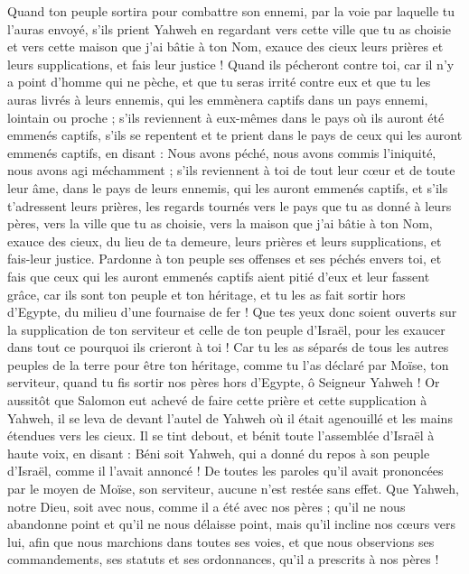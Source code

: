 \begin{multicols}{2}
Quand ton peuple sortira pour combattre son ennemi, par la voie par laquelle tu l'auras envoyé, s'ils prient Yahweh en regardant vers cette ville que tu as choisie et vers cette maison que j'ai bâtie à ton Nom, 
exauce des cieux leurs prières et leurs supplications, et fais leur justice !
Quand ils pécheront contre toi, car il n'y a point d'homme qui ne pèche, et que tu seras irrité contre eux et que tu les auras livrés à leurs ennemis, qui les emmènera captifs dans un pays ennemi, lointain ou proche ;
s'ils reviennent à eux-mêmes dans le pays où ils auront été emmenés captifs, s'ils se repentent et te prient dans le pays de ceux qui les auront emmenés captifs, en disant : Nous avons péché, nous avons commis l'iniquité, nous avons agi méchamment ;
s'ils reviennent à toi de tout leur cœur et de toute leur âme, dans le pays de leurs ennemis, qui les auront emmenés captifs, et s'ils t'adressent leurs prières, les regards tournés vers le pays que tu as donné à leurs pères, vers la ville que tu as choisie, vers la maison que j'ai bâtie à ton Nom,
exauce des cieux, du lieu de ta demeure, leurs prières et leurs supplications, et fais-leur justice.
Pardonne à ton peuple ses offenses et ses péchés envers toi, et fais que ceux qui les auront emmenés captifs aient pitié d'eux et leur fassent grâce,
car ils sont ton peuple et ton héritage, et tu les as fait sortir hors d'Egypte, du milieu d'une fournaise de fer !
Que tes yeux donc soient ouverts sur la supplication de ton serviteur et celle de ton peuple d'Israël, pour les exaucer dans tout ce pourquoi ils crieront à toi !
Car tu les as séparés de tous les autres peuples de la terre pour être ton héritage, comme tu l'as déclaré par Moïse, ton serviteur, quand tu fis sortir nos pères hors d'Egypte, ô Seigneur Yahweh !
Or aussitôt que Salomon eut achevé de faire cette prière et cette supplication à Yahweh, il se leva de devant l'autel de Yahweh où il était agenouillé et les mains étendues vers les cieux.
Il se tint debout, et bénit toute l'assemblée d'Israël à haute voix, en disant :
Béni soit Yahweh, qui a donné du repos à son peuple d'Israël, comme il l'avait annoncé ! De toutes les paroles qu'il avait prononcées par le moyen de Moïse, son serviteur, aucune n'est restée sans effet.
Que Yahweh, notre Dieu, soit avec nous, comme il a été avec nos pères ; qu'il ne nous abandonne point et qu'il ne nous délaisse point,
mais qu'il incline nos cœurs vers lui, afin que nous marchions dans toutes ses voies, et que nous observions ses commandements, ses statuts et ses ordonnances, qu'il a prescrits à nos pères !

\end{multicols}
